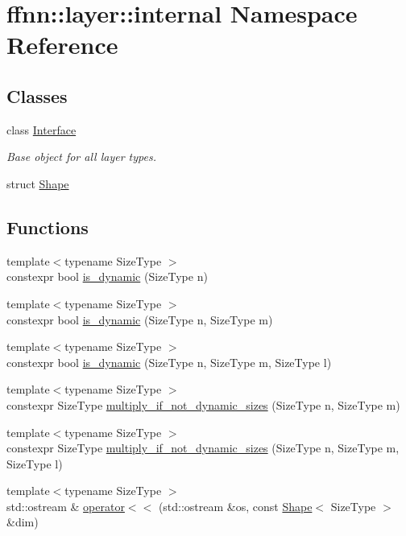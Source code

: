 \hypertarget{namespaceffnn_1_1layer_1_1internal}{\section{ffnn\-:\-:layer\-:\-:internal Namespace Reference}
\label{namespaceffnn_1_1layer_1_1internal}
}
\subsection*{Classes}
\begin{DoxyCompactItemize}
\item 
class \hyperlink{classffnn_1_1layer_1_1internal_1_1_interface}{Interface}
\begin{DoxyCompactList}\small\item\em Base object for all layer types. \end{DoxyCompactList}\item 
struct \hyperlink{structffnn_1_1layer_1_1internal_1_1_shape}{Shape}
\end{DoxyCompactItemize}
\subsection*{Functions}
\begin{DoxyCompactItemize}
\item 
{\footnotesize template$<$typename Size\-Type $>$ }\\constexpr bool \hyperlink{namespaceffnn_1_1layer_1_1internal_a80747f67832029051c2f96d3a1586e98}{is\-\_\-dynamic} (Size\-Type n)
\item 
{\footnotesize template$<$typename Size\-Type $>$ }\\constexpr bool \hyperlink{namespaceffnn_1_1layer_1_1internal_af66c362036e43d1d913b6c43d90f6c3e}{is\-\_\-dynamic} (Size\-Type n, Size\-Type m)
\item 
{\footnotesize template$<$typename Size\-Type $>$ }\\constexpr bool \hyperlink{namespaceffnn_1_1layer_1_1internal_ab770642661e0d57c0113788a5e127f57}{is\-\_\-dynamic} (Size\-Type n, Size\-Type m, Size\-Type l)
\item 
{\footnotesize template$<$typename Size\-Type $>$ }\\constexpr Size\-Type \hyperlink{namespaceffnn_1_1layer_1_1internal_ab5b2ac985b32bc289c8748933e2ba113}{multiply\-\_\-if\-\_\-not\-\_\-dynamic\-\_\-sizes} (Size\-Type n, Size\-Type m)
\item 
{\footnotesize template$<$typename Size\-Type $>$ }\\constexpr Size\-Type \hyperlink{namespaceffnn_1_1layer_1_1internal_a93d6cc4da6e3aa83fda7f6beb6eb07f5}{multiply\-\_\-if\-\_\-not\-\_\-dynamic\-\_\-sizes} (Size\-Type n, Size\-Type m, Size\-Type l)
\item 
{\footnotesize template$<$typename Size\-Type $>$ }\\std\-::ostream \& \hyperlink{namespaceffnn_1_1layer_1_1internal_a60e6be53b5701e3389204e5b1aaaf9ae}{operator$<$$<$} (std\-::ostream \&os, const \hyperlink{structffnn_1_1layer_1_1internal_1_1_shape}{Shape}$<$ Size\-Type $>$ \&dim)
\end{DoxyCompactItemize}


